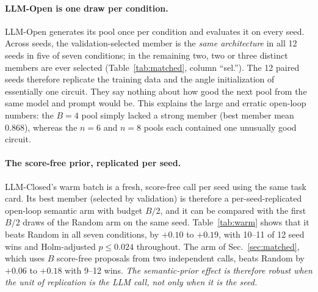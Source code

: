 \documentclass[11pt]{article}
\begin{document}
\paragraph{LLM-Open is one draw per condition.}
LLM-Open generates its pool once per condition and evaluates it on every seed.
Across seeds, the validation-selected member is the \emph{same architecture} in all 12
seeds in five of seven conditions; in the remaining two, two or three distinct members
are ever selected (Table~\ref{tab:matched}, column ``sel.''). The 12 paired seeds
therefore replicate the training data and the angle initialization of essentially one
circuit. They say nothing about how good the next pool from the same model and prompt
would be. This explains the large and erratic open-loop numbers: the $B=4$ pool simply
lacked a strong member (best member mean $0.868$), whereas the $n=6$ and $n=8$ pools each
contained one unusually good circuit.

\paragraph{The score-free prior, replicated per seed.}
LLM-Closed's warm batch is a fresh, score-free call per seed using the same task card.
Its best member (selected by validation) is therefore a per-seed-replicated open-loop
semantic arm with budget $B/2$, and it can be compared with the first $B/2$ draws of
the Random arm on the same seed.
Table~\ref{tab:warm} shows that it beats Random in all seven conditions, by $+0.10$ to
$+0.19$, with 10--11 of 12 seed wins and Holm-adjusted $p\le0.024$ throughout.
The arm of Sec.~\ref{sec:matched}, which uses $B$ score-free proposals from two
independent calls, beats Random by $+0.06$ to $+0.18$ with 9--12 wins.
\emph{The semantic-prior effect is therefore robust when the unit of replication is the
LLM call, not only when it is the seed.}
\end{document}
